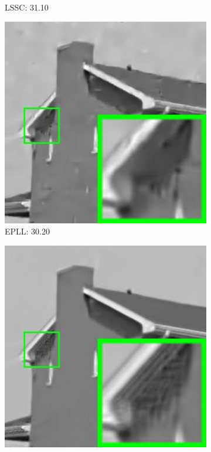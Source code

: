 \begin{figure}
\begin{subfigure}[t]{0.24\textwidth}
		\caption{LSSC: 31.10}
    \end{subfigure}
    \hfill
    \begin{subfigure}[t]{0.24\textwidth}
        \centering
        \includegraphics[width=1\textwidth]{images/pgpd/br_EPLL_40_house.jpg}
		\caption{EPLL: 30.20}
    \end{subfigure}
    \hfill
    \begin{subfigure}[t]{0.24\textwidth}
        \centering
        \includegraphics[width=1\textwidth]{images/pgpd/br_NCSR_40_house.jpg}

\end{subfigure}
\end{figure}
